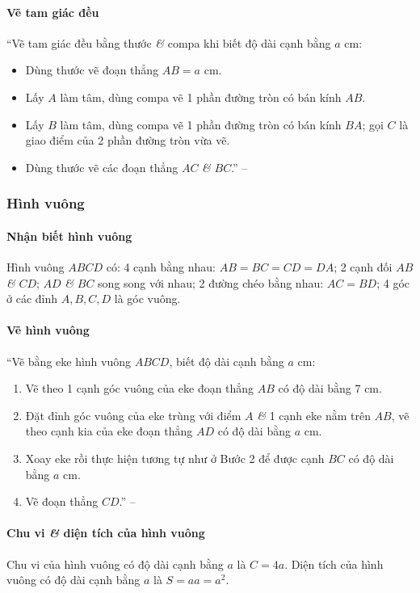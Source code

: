 \documentclass{article}
\numberwithin{equation}{section}
\begin{document}
\paragraph{Vẽ tam giác đều}
``Vẽ tam giác đều bằng thước \textit{\&} compa khi biết độ dài cạnh bằng $a$ cm:
\begin{itemize}
	\item Dùng thước vẽ đoạn thẳng $AB = a$ cm.
	\item Lấy $A$ làm tâm, dùng compa vẽ 1 phần đường tròn có bán kính $AB$.
	\item Lấy $B$ làm tâm, dùng compa vẽ 1 phần đường tròn có bán kính $BA$; gọi $C$ là giao điểm của 2 phần đường tròn vừa vẽ.
	\item Dùng thước vẽ các đoạn thẳng $AC$ \textit{\&} $BC$.'' -- \cite[p. 94]{SGK_Toan_6_Canh_Dieu_tap_1}
\end{itemize}

\subsubsection{Hình vuông}

\paragraph{Nhận biết hình vuông}
Hình vuông $ABCD$ có: 4 cạnh bằng nhau: $AB = BC = CD = DA$; 2 cạnh đối $AB$ \textit{\&} $CD$; $AD$ \textit{\&} $BC$ song song với nhau; 2 đường chéo bằng nhau: $AC = BD$; 4 góc ở các đỉnh $A,B,C,D$ là góc vuông.

\paragraph{Vẽ hình vuông}
``Vẽ bằng eke hình vuông $ABCD$, biết độ dài cạnh bằng $a$ cm:
\begin{enumerate}
	\item Vẽ theo 1 cạnh góc vuông của eke đoạn thẳng $AB$ có độ dài bằng 7 cm.
	\item Đặt đỉnh góc vuông của eke trùng với điểm $A$ \textit{\&} 1 cạnh eke nằm trên $AB$, vẽ theo cạnh kia của eke đoạn thẳng $AD$ có độ dài bằng $a$ cm.
	\item Xoay eke rồi thực hiện tương tự như ở Bước 2 để được cạnh $BC$ có độ dài bằng $a$ cm.
	\item Vẽ đoạn thẳng $CD$.'' -- \cite[p. 95]{SGK_Toan_6_Canh_Dieu_tap_1}
\end{enumerate}

\paragraph{Chu vi \textit{\&} diện tích của hình vuông}
Chu vi của hình vuông có độ dài cạnh bằng $a$ là $C = 4a$. Diện tích của hình vuông có độ dài cạnh bằng $a$ là $S = aa = a^2$.
\end{document}
